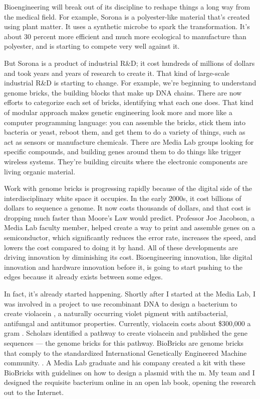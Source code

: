 Bioengineering will break out of its discipline to reshape things a long way from the medical field. For example, Sorona is a polyester-like material that's created using plant matter. It uses a synthetic microbe to spark the transformation. It's about 30 percent more efficient and much more ecological to manufacture than polyester, and is starting to compete very well against it. 

But Sorona is a product of industrial R\&D; it cost hundreds of millions of dollars and took years and years of research to create it. That kind of large-scale industrial R\&D is starting to change. For example, we're beginning to understand genome bricks, the building blocks that make up DNA chains. There are now efforts to categorize each set of bricks, identifying what each one does. That kind of modular approach makes genetic engineering look more and more like a computer programming language: you can assemble the bricks, stick them into bacteria or yeast, reboot them, and get them to do a variety of things, such as act as sensors or manufacture chemicals. There are Media Lab groups looking for specific compounds, and building genes around them to do things like trigger wireless systems. They're building circuits where the electronic components are living organic material.

Work with genome bricks is progressing rapidly because of the digital side of the interdisciplinary white space it occupies. In the early 2000s, it cost billions of dollars to sequence a genome. It now costs thousands of dollars, and that cost is dropping much faster than Moore's Law would predict. Professor Joe Jacobson, a Media Lab faculty member, helped create a way to print and assemble genes on a semiconductor, which significantly reduces the error rate, increases the speed, and lowers the cost compared to doing it by hand. All of these developments are driving innovation by diminishing its cost. Bioengineering innovation, like digital innovation and hardware innovation before it, is going to start pushing to the edges because it already exists between some edges.

In fact, it's already started happening. Shortly after I started at the Media Lab, I was involved in a project to use recombinant DNA to design a bacterium to create violacein \cite{bolton2014biohackers}, a naturally occurring violet pigment with antibacterial, antifungal and antitumor properties. Currently, violacein costs about \$300,000 a gram \cite{violacei33:online}. Scholars identified a pathway to create violacein and published the gene sequences --- the genome bricks for this pathway. BioBricks are genome bricks that comply to the standardized International Genetically Engineered Machine community. \cite{anderson2010bglbricks}. A Media Lab graduate and his company created a kit with these BioBricks with guidelines on how to design a plasmid with the m. My team and I designed the requisite bacterium online in an open lab book, opening the research out to the Internet. 


